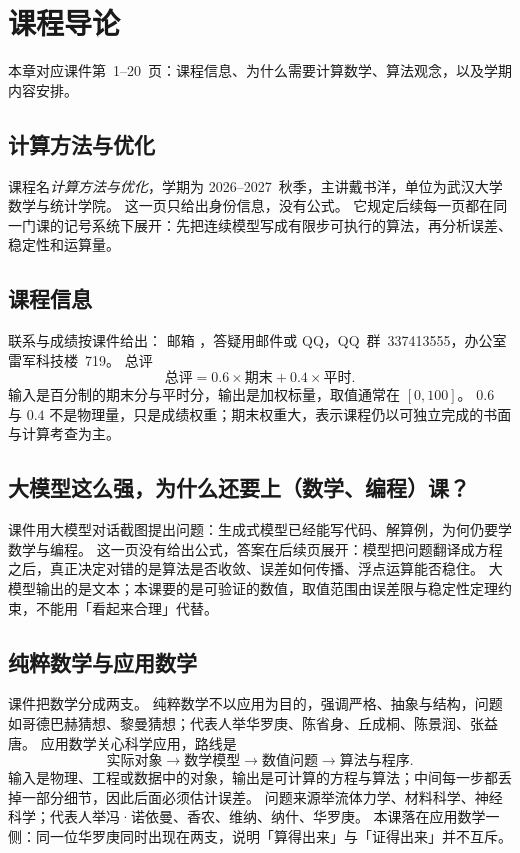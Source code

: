 \chapter{课程导论}

本章对应课件第~1--20~页：课程信息、为什么需要计算数学、算法观念，以及学期内容安排。

\section{计算方法与优化}

课程名\emph{计算方法与优化}，学期为 2026--2027~秋季，主讲戴书洋，单位为武汉大学数学与统计学院。
这一页只给出身份信息，没有公式。
它规定后续每一页都在同一门课的记号系统下展开：先把连续模型写成有限步可执行的算法，再分析误差、稳定性和运算量。

\section{课程信息}

联系与成绩按课件给出：
邮箱 ，答疑用邮件或 QQ，QQ~群~337413555，办公室雷军科技楼~719。
总评
\[
\text{总评}=0.6\times\text{期末}+0.4\times\text{平时}.
\]
输入是百分制的期末分与平时分，输出是加权标量，取值通常在 $[0,100]$。
$0.6$ 与 $0.4$ 不是物理量，只是成绩权重；期末权重大，表示课程仍以可独立完成的书面与计算考查为主。

\section{大模型这么强，为什么还要上（数学、编程）课？}

课件用大模型对话截图提出问题：生成式模型已经能写代码、解算例，为何仍要学数学与编程。
这一页没有给出公式，答案在后续页展开：模型把问题翻译成方程之后，真正决定对错的是算法是否收敛、误差如何传播、浮点运算能否稳住。
大模型输出的是文本；本课要的是可验证的数值，取值范围由误差限与稳定性定理约束，不能用「看起来合理」代替。

\section{纯粹数学与应用数学}


课件把数学分成两支。
纯粹数学不以应用为目的，强调严格、抽象与结构，问题如哥德巴赫猜想、黎曼猜想；代表人举华罗庚、陈省身、丘成桐、陈景润、张益唐。
应用数学关心科学应用，路线是
\[
\text{实际对象}\to\text{数学模型}\to\text{数值问题}\to\text{算法与程序}.
\]
输入是物理、工程或数据中的对象，输出是可计算的方程与算法；中间每一步都丢掉一部分细节，因此后面必须估计误差。
问题来源举流体力学、材料科学、神经科学；代表人举冯·诺依曼、香农、维纳、纳什、华罗庚。
本课落在应用数学一侧：同一位华罗庚同时出现在两支，说明「算得出来」与「证得出来」并不互斥。

